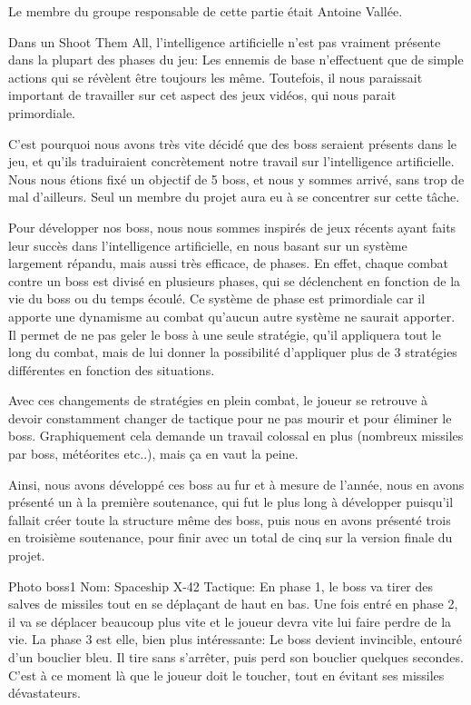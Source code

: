 \par Le membre du groupe responsable de cette partie était Antoine Vallée.

\par Dans un Shoot Them All, l'intelligence artificielle n'est pas vraiment présente dans la plupart des phases du jeu: Les ennemis de base n'effectuent que de simple actions qui se révèlent être toujours les même. Toutefois, il nous paraissait important de travailler sur cet aspect des jeux vidéos, qui nous parait primordiale.
\par C'est pourquoi nous avons très vite décidé que des boss seraient présents dans le jeu, et qu'ils traduiraient concrètement notre travail sur l'intelligence artificielle. Nous nous étions fixé un objectif de 5 boss, et nous y sommes arrivé, sans trop de mal d'ailleurs. Seul un membre du projet aura eu à se concentrer sur cette tâche.
\par Pour développer nos boss, nous nous sommes inspirés de jeux récents ayant faits leur succès dans l'intelligence artificielle, en nous basant sur un système largement répandu, mais aussi très efficace, de phases. En effet, chaque combat contre un boss est divisé en plusieurs phases, qui se déclenchent en fonction de la vie du boss ou du temps écoulé. Ce système de phase est primordiale car il apporte une dynamisme au combat qu'aucun autre système ne saurait apporter. Il permet de ne pas geler le boss à une seule stratégie, qu'il appliquera tout le long du combat, mais de lui donner la possibilité d'appliquer plus de 3 stratégies différentes en fonction des situations.
\par Avec ces changements de stratégies en plein combat, le joueur se retrouve à devoir constamment changer de tactique pour ne pas mourir et pour éliminer le boss. Graphiquement cela demande un travail colossal en plus (nombreux missiles par boss, météorites etc..), mais ça en vaut la peine.
\par Ainsi, nous avons développé ces boss au fur et à mesure de l'année, nous en avons présenté un à la première soutenance, qui fut le plus long à développer puisqu'il fallait créer toute la structure même des boss, puis nous en avons présenté trois en troisième soutenance, pour finir avec un total de cinq sur la version finale du projet.


\par Photo boss1   Nom: Spaceship X-42
               Tactique: En phase 1, le boss va tirer des salves de missiles tout en se déplaçant de haut en bas. Une fois entré en phase 2, il va se déplacer beaucoup plus vite et le joueur devra vite lui faire perdre de la vie. La phase 3 est elle, bien plus intéressante: Le boss devient invincible, entouré d'un bouclier bleu. Il tire sans s'arrêter, puis perd son bouclier quelques secondes. C'est à ce moment là que le joueur doit le toucher, tout en évitant ses missiles dévastateurs.
			   
